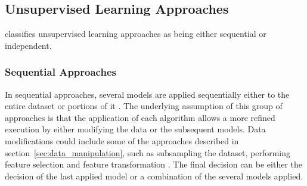 
\subsection{Unsupervised Learning Approaches}

\textcite{Aggarwal:2013:OA:2436823} classifies unsupervised learning approaches as being either sequential or independent.

\subsubsection{Sequential Approaches}

In sequential approaches, several models are applied sequentially either to the entire dataset or portions of it \cite{Aggarwal:2013:OA:2436823}.
The underlying assumption of this group of approaches is that the application of each algorithm allows a more refined execution by either modifying the data or the subsequent models.
Data modifications could include some of the approaches described in section~\ref{sec:data_manipulation}, such as subsampling the dataset, performing feature selection and feature transformation \cite{Aggarwal:2013:OA:2436823}.
The final decision can be either the decision of the last applied model or a combination of the several models applied.

